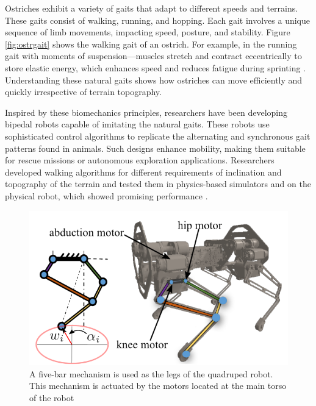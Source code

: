 \documentclass[12pt]{article}
\begin{document}
Ostriches exhibit a variety of gaits that adapt to different speeds and terrains. These gaits consist of walking, running, and hopping. Each gait involves a unique sequence of limb movements, impacting speed, posture, and stability. Figure \ref{fig:ostrgait} shows the walking gait of an ostrich. For example, in the running gait with moments of suspension—muscles stretch and contract eccentrically to store elastic energy, which enhances speed and reduces fatigue during sprinting \cite{drama2020b}. Understanding these natural gaits shows how ostriches can move efficiently and quickly irrespective of terrain topography.


Inspired by these biomechanics principles, researchers have been developing bipedal robots capable of imitating the natural gaits. These robots use sophisticated control algorithms to replicate the alternating and synchronous gait patterns found in animals. Such designs enhance mobility, making them suitable for rescue missions or autonomous exploration applications. Researchers developed walking algorithms for different requirements of inclination and topography of the terrain and tested them in physics-based simulators and on the physical robot, which showed promising performance \cite{daley2019running} \cite{pratt2008design}.

\begin{figure}[h!]
\centering
\includegraphics[scale=0.5]{figures/fivebar.png}
\caption{A five-bar mechanism is used as the legs of the quadruped robot. This mechanism is actuated by the motors located at the main torso of the robot \cite{tirumala2019gait}}
\label{fig:fivebar}
\end{figure}
\end{document}
